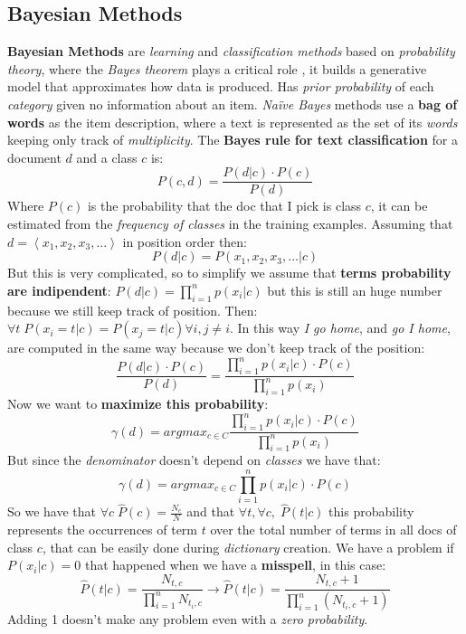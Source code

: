 \documentclass{article}
\begin{document}
\subsection{Bayesian Methods}
\textbf{Bayesian Methods} are \emph{learning} and \emph{classification methods} based on \emph{probability theory}, where the \emph{Bayes theorem} plays a critical role , it builds a generative model that approximates how data is produced. Has \emph{prior probability} of each \emph{category} given no information about an item. \emph{Naïve Bayes} methods use a \textbf{bag of words} as the item description, where a text is represented as the set of its \emph{words} keeping only track of \emph{multiplicity}. The \textbf{Bayes rule for text classification} for a document $d$ and a class $c$ is:
 \[P(c,d) = \frac{P(d|c)\cdot P(c)}{P(d)}\]
Where $P(c)$ is the probability that the doc that I pick is class $c$, it can be estimated from the \emph{frequency of classes} in the training examples. Assuming that $d = \left \langle x_1, x_2, x_3, ... \right \rangle$ in position order then:
\[P(d|c) = P(x_1, x_2, x_3,... | c)\] 
But this is very complicated, so to simplify we assume that \textbf{terms probability are indipendent}: $P(d|c) = \prod_{i=1}^{n} p(x_i | c)$ but this is still an huge number because we still keep track of position. Then: $\forall t\; P(x_i = t |c) = P(x_j = t | c) \forall i,j \neq i$.
In this way\emph{ I go home}, and\emph{ go I home}, are computed in the same way because we don't keep track of the position:
\[\frac{P(d|c) \cdot P(c)}{P(d)} = \frac{\prod_{i=1}^{n} p(x_i | c)\cdot P(c)}{\prod_{i=1}^{n} p(x_i)}\]
Now we want to \textbf{maximize this probability}:
\[\gamma(d) = argmax_{c \in C} \frac{\prod_{i=1}^{n} p(x_i | c)\cdot P(c)}{\prod_{i=1}^{n} p(x_i)}\]
But since the \emph{denominator} doesn't depend on \emph{classes} we have that:
\[\gamma(d) = argmax_{c \in C}\prod_{i=1}^{n} p(x_i | c)\cdot P(c)\]
So we have that $\forall c\; \hat{P}(c) = \frac{N_c}{N}$ and that $\forall t,\forall c, \; \hat{P}(t|c)$ this probability represents the occurrences of term $t$ over the total number of terms in all docs of class $c$, that can be easily done during \emph{dictionary} creation. We have a problem if $P(x_i |c) = 0$ that happened when we have a \textbf{misspell}, in this case: 
\[\hat{P}(t|c) = \frac{N_{t,c}}{\prod_{i=1}^{n} N_{t_i,c}} \rightarrow \hat{P}(t|c) = \frac{N_{t,c}+1}{\prod_{i=1}^{n} (N_{t_i,c}+1)} \]
Adding 1 doesn't make any problem even with a \emph{zero probability}. \\\\
\end{document}
